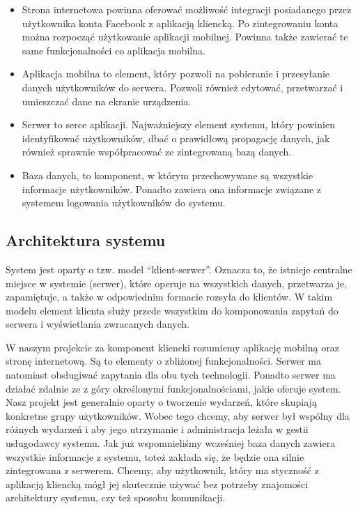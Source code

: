 \documentclass[10pt,titlepage]{article}
\begin{document}
\begin{itemize} %
 \item Strona internetowa powinna oferować możliwość integracji posiadanego przez użytkownika konta Facebook z aplikacją kliencką.
 Po zintegrowaniu konta można rozpocząć użytkowanie aplikacji mobilnej. Powinna także zawierać te same funkcjonalności co aplikacja mobilna.
 \item Aplikacja mobilna to element, który pozwoli na pobieranie i przesyłanie danych użytkowników do serwera. Pozwoli również edytować, przetwarzać i umieszczać
dane na ekranie urządzenia. 
 \item Serwer to serce aplikacji. Najważniejszy element systemu, który powinien identyfikować użytkowników, dbać o prawidłową propagację danych, jak również
 sprawnie współpracować ze zintegrowaną bazą danych.
 \item Baza danych, to komponent, w którym przechowywane są wszystkie informacje użytkowników. Ponadto zawiera ona informacje związane z systemem logowania użytkowników do systemu.
\end{itemize}

\subsection{Architektura systemu}
System jest oparty o tzw. model ``klient-serwer''. Oznacza to, że istnieje centralne miejsce w systemie (serwer), które operuje na wszystkich danych, przetwarza je, zapamiętuje, a także w odpowiednim
formacie rozsyła do klientów. W takim modelu element klienta służy przede wszystkim do komponowania zapytań do serwera i wyświetlania zwracanych danych.

W naszym projekcie za komponent kliencki rozumiemy aplikację mobilną oraz stronę internetową. Są to elementy o zbliżonej funkcjonalności. Serwer ma natomiast obsługiwać zapytania dla obu tych technologii.
Ponadto serwer ma działać zdalnie ze z góry określonymi funkcjonalnościami, jakie oferuje system.
Nasz projekt jest generalnie oparty o tworzenie wydarzeń, które skupiają konkretne grupy użytkowników. Wobec tego chcemy, aby serwer był wspólny dla różnych wydarzeń i aby jego utrzymanie i administracja
leżała w gestii usługodawcy systemu.
Jak już wspomnieliśmy wcześniej baza danych zawiera wszystkie informacje z systemu, toteż zakłada się, że będzie ona silnie zintegrowana z serwerem. Chcemy, aby użytkownik, który ma styczność
z aplikacją kliencką mógł jej skutecznie używać bez potrzeby znajomości architektury systemu, czy też sposobu komunikacji.
\end{document}

